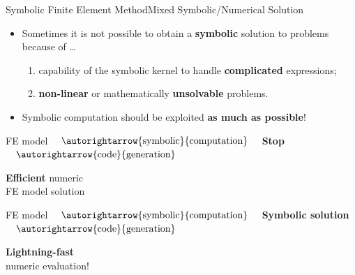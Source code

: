 \begin{frame}{Symbolic Finite Element Method}{Mixed Symbolic/Numerical Solution}
  \begin{itemize}
    \item Sometimes it is not possible to obtain a \textbf{symbolic} solution to problems because of \dots
    \begin{enumerate}
      \item capability of the symbolic kernel to handle \textbf{complicated} expressions;
      \item \textbf{non-linear} or mathematically \textbf{unsolvable} problems.
    \end{enumerate}
    \item Symbolic computation should be exploited \textbf{as much as possible}!
  \end{itemize}
  \begin{bbox}
    \centering
    \acs{FE} model $\quad \autorightarrow{\text{symbolic}}{\text{computation}} \quad$ \hspace*{1.05cm}\textcolor{mycolor2}{\textbf{Stop}}\hspace*{1.05cm} $\quad \autorightarrow{\text{code}}{\text{generation}} \quad$ \begin{minipage}[c]{0.27\linewidth}\begin{center}{\textcolor{fg_sl_color}{\textbf{Efficient}} numeric \\ \acs{FE} model solution}\end{center}\end{minipage}
  \end{bbox}
  \begin{bbox}
    \centering
    \acs{FE} model $\quad \autorightarrow{\text{symbolic}}{\text{computation}} \quad$ \textcolor{mycolor5}{\textbf{Symbolic solution}} $\quad \autorightarrow {\text{code}}{\text{generation}} \quad$ \begin{minipage}[c]{0.27\linewidth}\begin{center}{\textcolor{fg_sl_color}{\textbf{Lightning-fast}} \\ numeric evaluation!}\end{center}\end{minipage}
  \end{bbox}
\end{frame}


